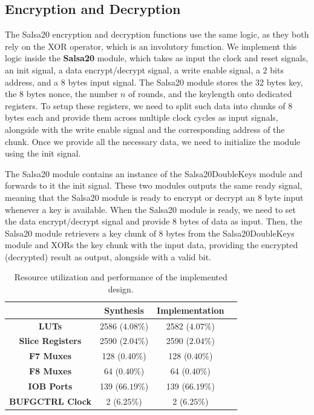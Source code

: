 \documentclass[letterpaper, 10pt, oneside]{article}
\begin{document}
\subsection{Encryption and Decryption}
The Salsa20 encryption and decryption functions use the same logic, as they both rely on the XOR operator, which is an involutory function.
We implement this logic inside the \textbf{Salsa20} module, which takes as input the clock and reset signals, an init signal, a data encrypt/decrypt signal, a write enable signal, a 2 bits address, and a 8 bytes input signal.
The Salsa20 module stores the 32 bytes key, the 8 bytes nonce, the number $n$ of rounds, and the keylength onto dedicated registers.
To setup these registers, we need to split such data into chunks of 8 bytes each and provide them across multiple clock cycles as input signals, alongside with the write enable signal and the corresponding address of the chunk.
Once we provide all the necessary data, we need to initialize the module using the init signal.

The Salsa20 module contains an instance of the Salsa20DoubleKeys module and forwards to it the init signal.
These two modules outputs the same ready signal, meaning that the Salsa20 module is ready to encrypt or decrypt an 8 byte input whenever a key is available.
When the Salsa20 module is ready, we need to set the data encrypt/decrypt signal and provide 8 bytes of data as input.
Then, the Salsa20 module retrievers a key chunk of 8 bytes from the Salsa20DoubleKeys module and XORs the key chunk with the input data, providing the encrypted (decrypted) result as output, alongside with a valid bit.

\begin{table}[!t]
    \centering
    \begin{tabular}{|c|c|c|c|}
        \hline
        ~ & \textbf{Synthesis} & \textbf{Implementation}\\
        \hline
        \textbf{LUTs} & 2586 ($4.08\%$) & 2582 ($4.07\%$)\\
        \hline
        \textbf{Slice Registers} & 2590 ($2.04\%$) & 2590 ($2.04\%$)\\
        \hline
        \textbf{F7 Muxes} & 128 ($0.40\%$) & 128 ($0.40\%$)\\
        \hline
        \textbf{F8 Muxes} & 64 ($0.40\%$) & 64 ($0.40\%$)\\
        \hline
        \textbf{IOB Ports} & 139 ($66.19\%$) & 139 ($66.19\%$)\\
        \hline
        \textbf{BUFGCTRL Clock} & 2 ($6.25\%$) & 2 ($6.25\%$)\\
        \hline
    \end{tabular}
    \caption{Resource utilization and performance of the implemented design.}
    \label{tab:results}
\end{table}
\end{document}
